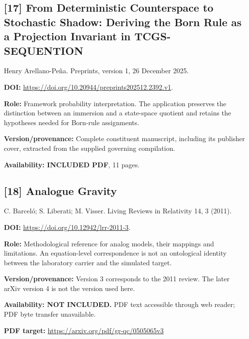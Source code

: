 \documentclass[11pt,a4paper]{article}
\begin{document}
\begin{minipage}{\textwidth}
\subsection*{[17] From Deterministic Counterspace to Stochastic Shadow: Deriving the Born Rule as a Projection Invariant in TCGS-SEQUENTION}
Henry Arellano-Pe\~na. Preprints, version 1, 26 December 2025.

\textbf{DOI:} \url{https://doi.org/10.20944/preprints202512.2392.v1}.

\textbf{Role:} Framework probability interpretation. The application preserves the distinction between an immersion and a state-space quotient and retains the hypotheses needed for Born-rule assignments.

\textbf{Version/provenance:} Complete constituent manuscript, including its publisher cover, extracted from the supplied governing compilation.

\textbf{Availability: INCLUDED PDF}, 11 pages.\par
{}
\end{minipage}
\par\medskip
\begin{minipage}{\textwidth}
\subsection*{[18] Analogue Gravity}
C. Barcel\'o; S. Liberati; M. Visser. Living Reviews in Relativity 14, 3 (2011).

\textbf{DOI:} \url{https://doi.org/10.12942/lrr-2011-3}.

\textbf{Role:} Methodological reference for analog models, their mappings and limitations. An equation-level correspondence is not an ontological identity between the laboratory carrier and the simulated target.

\textbf{Version/provenance:} Version 3 corresponds to the 2011 review. The later arXiv version 4 is not the version used here.

\textbf{Availability: NOT INCLUDED.} PDF text accessible through web reader; PDF byte transfer unavailable.\par
\textbf{PDF target:} \url{https://arxiv.org/pdf/gr-qc/0505065v3}
\end{minipage}
\par\medskip
\end{document}
